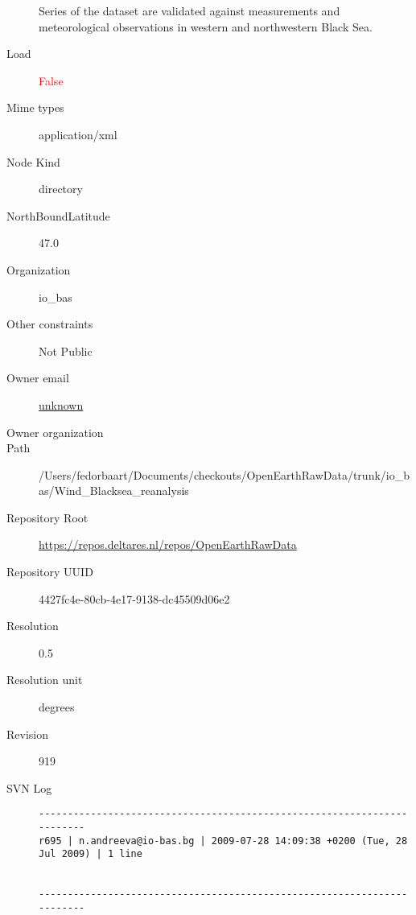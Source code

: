 \documentclass[9]{report}
\begin{document}
\begin{description}
Series of the dataset are validated against measurements and meteorological observations in western and northwestern Black Sea.
  \item[Load] \textcolor{red}{False}
  \item[Mime types] application/xml
  \item[Node Kind] directory
  \item[NorthBoundLatitude] 47.0
  \item[Organization] io\_bas
  \item[Other constraints] Not Public
  \item[Owner email] \href{mailto:unknown}{unknown}
  \item[Owner organization] 
  \item[Path] /Users/fedorbaart/Documents/checkouts/OpenEarthRawData/trunk/io\_bas/Wind\_Blacksea\_reanalysis
  \item[Repository Root] \href{https://repos.deltares.nl/repos/OpenEarthRawData}{https://repos.deltares.nl/repos/OpenEarthRawData}
  \item[Repository UUID] 4427fc4e-80cb-4e17-9138-dc45509d06e2
  \item[Resolution] 0.5
  \item[Resolution unit] degrees
  \item[Revision] 919
  \item[SVN Log] \begin{verbatim}
------------------------------------------------------------------------
r695 | n.andreeva@io-bas.bg | 2009-07-28 14:09:38 +0200 (Tue, 28 Jul 2009) | 1 line


------------------------------------------------------------------------


\end{verbatim}
\end{description}
\end{document}

